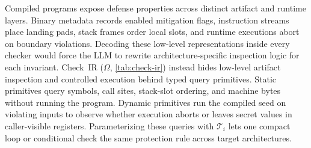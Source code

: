 \documentclass[conference,compsoc]{IEEEtran}
\begin{document}
\begin{table}[t]
\centering
\caption{Representative static and dynamic query primitives in Check~IR ($\Omega$).}
\label{tab:check-ir}
\footnotesize
\setlength{\tabcolsep}{3.0pt}
\renewcommand{\arraystretch}{1.12}
\end{table}

Compiled programs expose defense properties across distinct artifact and runtime layers. Binary metadata records enabled mitigation flags, instruction streams place landing pads, stack frames order local slots, and runtime executions abort on boundary violations. Decoding these low-level representations inside every checker would force the LLM to rewrite architecture-specific inspection logic for each invariant. Check~IR ($\Omega$, \autoref{tab:check-ir}) instead hides low-level artifact inspection and controlled execution behind typed query primitives. Static primitives query symbols, call sites, stack-slot ordering, and machine bytes without running the program. Dynamic primitives run the compiled seed on violating inputs to observe whether execution aborts or leaves secret values in caller-visible registers. Parameterizing these queries with $\mathcal{T}_i$ lets one compact loop or conditional check the same protection rule across target architectures.
\end{document}
